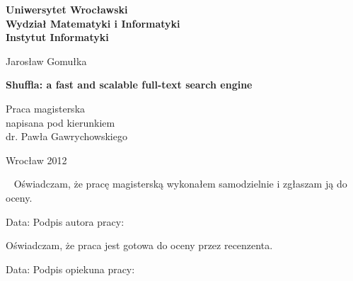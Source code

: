 \documentclass[10pt,a4paper]{article}
\begin{document}


\topmargin-20pt
\textwidth445pt

\begin{titlepage}
\Large

\begin{center}

\textbf{\large%
Uniwersytet Wrocławski\\
Wydział Matematyki i Informatyki\\
Instytut Informatyki}


\vspace{4cm}
Jarosław Gomułka 

\vspace{0.5cm}
\textbf{%
Shuffla: a fast and scalable full-text search engine}

\end{center}

\vspace{7cm}
\begin{flushright}
\begin{minipage}[c]{6.2cm}
  Praca magisterska\\
  napisana pod kierunkiem\\
  dr. Pawła Gawrychowskiego
\end{minipage}
\end{flushright}

\vfill

\begin{center}
 Wrocław 2012
\end{center}

\newpage

\end{titlepage}

\newpage

\thispagestyle{empty}

\Large

~\vfill
Oświadczam, że pracę magisterską wykonałem samodzielnie i zgłaszam ją do oceny.

\vspace{2cm}
Data: \dotfill\quad Podpis autora pracy: \dotfill


\vspace{4cm}
Oświadczam, że praca jest gotowa do oceny przez recenzenta.

\vspace{2cm}
Data: \dotfill\quad Podpis opiekuna pracy: \dotfill
\end{document}
